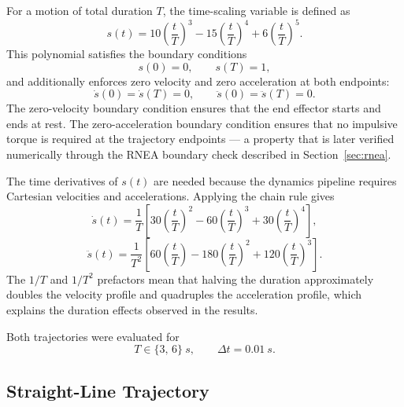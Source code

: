 \documentclass[12pt,a4paper]{article}
\begin{document}
For a motion of total duration $T$, the time-scaling variable is defined as
\begin{equation}
    s(t) = 10\!\left(\frac{t}{T}\right)^{\!3}
           - 15\!\left(\frac{t}{T}\right)^{\!4}
           + 6\!\left(\frac{t}{T}\right)^{\!5}.
    \label{eq:quintic}
\end{equation}
This polynomial satisfies the boundary conditions
\begin{equation}
    s(0) = 0, \qquad s(T) = 1,
\end{equation}
and additionally enforces zero velocity and zero acceleration at both endpoints:
\begin{equation}
    \dot{s}(0) = \dot{s}(T) = 0, \qquad
    \ddot{s}(0) = \ddot{s}(T) = 0.
\end{equation}
The zero-velocity boundary condition ensures that the end effector starts and ends at rest.
The zero-acceleration boundary condition ensures that no impulsive torque is required at the
trajectory endpoints --- a property that is later verified numerically through the RNEA
boundary check described in Section~\ref{sec:rnea}.

The time derivatives of $s(t)$ are needed because the dynamics pipeline requires Cartesian
velocities and accelerations. Applying the chain rule gives
\begin{equation}
    \dot{s}(t) = \frac{1}{T}\!\left[
        30\!\left(\frac{t}{T}\right)^{\!2}
      - 60\!\left(\frac{t}{T}\right)^{\!3}
      + 30\!\left(\frac{t}{T}\right)^{\!4}
    \right],
\end{equation}
\begin{equation}
    \ddot{s}(t) = \frac{1}{T^2}\!\left[
        60\!\left(\frac{t}{T}\right)
      - 180\!\left(\frac{t}{T}\right)^{\!2}
      + 120\!\left(\frac{t}{T}\right)^{\!3}
    \right].
\end{equation}
The $1/T$ and $1/T^2$ prefactors mean that halving the duration approximately doubles the
velocity profile and quadruples the acceleration profile, which explains the duration effects
observed in the results.

Both trajectories were evaluated for
\begin{equation}
    T \in \{3,\,6\}\ \si{s}, \qquad \Delta t = \SI{0.01}{s}.
\end{equation}

\subsection{Straight-Line Trajectory}
\end{document}
